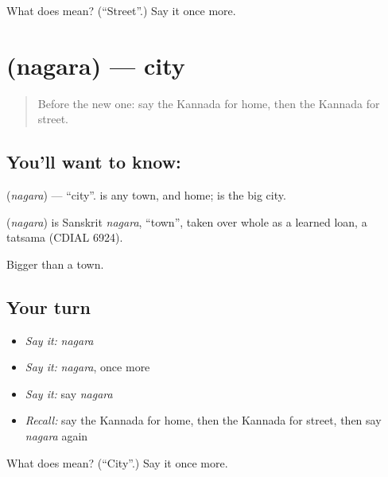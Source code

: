 \begin{tcolorbox}[breakable,colback=teal!4,colframe=teal!35!black,title={Before you move on}]
What does  mean? (\textquotedblleft{}Street\textquotedblright{}.) Say it once more.
\end{tcolorbox}
\section[\texorpdfstring{\kn{ನಗರ} (nagara)}{ನಗರ (nagara)}]{ (nagara) — city}

\label{lesson:KA-C103-city}



\begin{quote}
Before the new one: say the Kannada for home, then the Kannada for street.
\end{quote}

\subsection*{You'll want to know: }
\textbf{} (\emph{nagara}) — \textquotedblleft{}city\textquotedblright{}. \textbf{} is any town, and home; \textbf{} is the big city.

\begin{cousinweb}
\textbf{} (\emph{nagara}) is Sanskrit \emph{nagara}, \textquotedblleft{}town\textquotedblright{}, taken over whole as a learned loan, a tatsama (CDIAL 6924).
\end{cousinweb}

\begin{grammarlens}[title={What you've built}]
Bigger than a town.
\end{grammarlens}

\subsection*{Your turn}
\begin{itemize}
\raggedright
  \item \emph{Say it:} \emph{nagara}
  \item \emph{Say it:} \emph{nagara}, once more
  \item \emph{Say it:} say \emph{nagara}
  \item \emph{Recall:} say the Kannada for home, then the Kannada for street, then say \emph{nagara} again
\end{itemize}

\begin{tcolorbox}[breakable,colback=teal!4,colframe=teal!35!black,title={Before you move on}]
What does  mean? (\textquotedblleft{}City\textquotedblright{}.) Say it once more.
\end{tcolorbox}
